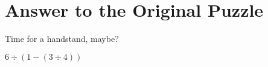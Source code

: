 \documentclass[english,smartquotes]{hgbarticle}
\begin{document}
\section{Answer to the Original Puzzle}

Time for a handstand, maybe?

\begin{rotanswer}
$6\div(1-(3\div 4))$
\end{rotanswer}

\printbibliography %

\end{document}
